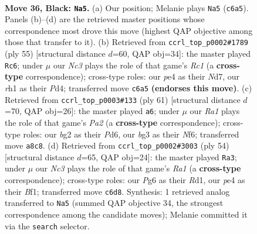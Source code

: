 \documentclass[11pt]{article}
\begin{document}
\clearpage

\begin{figure}[p]\centering
\begin{subfigure}{0.46\textwidth}\centering
\resizebox{\linewidth}{!}{%
\newchessgame
\chessboard[
  setfen={r5r1/5kbp/p1np2p1/4p1P1/1p2P2P/1P3PB1/P1PK2B1/R6R b - - 2 36},
  showmover=false,
  pgfstyle=straightmove, color=movearrow, markmove={c6-a5}
]}
\caption{}
\end{subfigure}\hfill
\begin{subfigure}{0.46\textwidth}\centering
\resizebox{\linewidth}{!}{%
\newchessgame
\chessboard[
  setfen={2r1r3/p2n1kp1/3bp2p/2p5/2Pp1P2/1P1N2P1/P2B2KP/R4R2 b - - 1 28},
  showmover=false,
  pgfstyle=straightmove, color=movearrow, markmove={c8-c6}
]}
\caption{}
\end{subfigure}
\\[4pt]
\begin{subfigure}{0.46\textwidth}\centering
\resizebox{\linewidth}{!}{%
\newchessgame
\chessboard[
  setfen={1r1r4/p3kp2/3p1n2/1b2p2p/4P1pP/PPR3P1/3N1PB1/2R3K1 b - - 1 31},
  showmover=false,
  pgfstyle=straightmove, color=movearrow, markmove={a7-a6}
]}
\caption{}
\end{subfigure}\hfill
\begin{subfigure}{0.46\textwidth}\centering
\resizebox{\linewidth}{!}{%
\newchessgame
\chessboard[
  setfen={r3r1k1/1pb2p2/2b3p1/p1Bp2Pp/P6P/2P2P2/1P3K2/R2R1B2 w - - 12 28},
  showmover=false,
  pgfstyle=straightmove, color=movearrow, markmove={a1-a3}
]}
\caption{}
\end{subfigure}
\caption{\textbf{Move 36, Black: \texttt{Na5}.} (a) Our position; Melanie plays \texttt{Na5} (\texttt{c6a5}). Panels (b)--(d) are the retrieved master positions whose correspondence most drove this move (highest QAP objective among those that transfer to it). (b) Retrieved from \texttt{ccrl\_top\_p0002\#1789} (ply 55) [structural distance $d$=60, QAP obj=34]: the master played \texttt{Rc6}; under $\mu$ our \emph{Nc3} plays the role of that game's \emph{Rc1} (a \textbf{cross-type} correspondence); cross-type roles: our \emph{p}e4 as their \emph{N}d7, our \emph{r}h1 as their \emph{P}d4; transferred move \texttt{c6a5} \textbf{(endorses this move)}. (c) Retrieved from \texttt{ccrl\_top\_p0003\#133} (ply 61) [structural distance $d$=70, QAP obj=26]: the master played \texttt{a6}; under $\mu$ our \emph{Ra1} plays the role of that game's \emph{Pa2} (a \textbf{cross-type} correspondence); cross-type roles: our \emph{b}g2 as their \emph{P}d6, our \emph{b}g3 as their \emph{N}f6; transferred move \texttt{a8c8}. (d) Retrieved from \texttt{ccrl\_top\_p0002\#3003} (ply 54) [structural distance $d$=65, QAP obj=24]: the master played \texttt{Ra3}; under $\mu$ our \emph{Nc3} plays the role of that game's \emph{Ra1} (a \textbf{cross-type} correspondence); cross-type roles: our \emph{P}g6 as their \emph{R}d1, our \emph{p}e4 as their \emph{B}f1; transferred move \texttt{c6d8}. Synthesis: 1 retrieved analog transferred to \texttt{Na5} (summed QAP objective 34, the strongest correspondence among the candidate moves); Melanie committed it via the \texttt{search} selector.}
\label{fig:thought-m71}
\end{figure}
\end{document}
